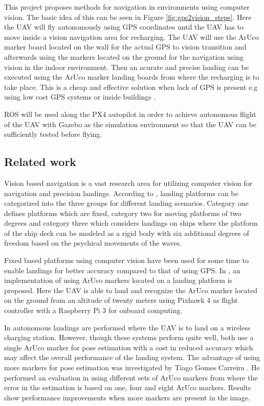\documentclass[../Head/report.tex]{subfiles}
\begin{document}
This project proposes methods for navigation in environments using computer vision. The basic idea of this can be seen in Figure \ref{fig:gps2vision_steps}. Here the UAV will fly autonomously using GPS coordinates until the UAV has to move inside a vision navigation area for recharging. The UAV will use the ArUco marker board located on the wall for the actual GPS to vision transition and afterwards using the markers located on the ground for the navigation using vision in the indoor environment. Then an acurate and precise landing can be executed using the ArUco marker landing boards from where the recharging is to take place. This is a cheap and effective solution when lack of GPS is present e.g using low cost GPS systems or inside buildings \cite{Visual-Inertial-Navigation}. 

ROS will be used along the PX4 autopilot in order to achieve autonomous flight of the UAV with Gazebo as the simulation environment so that the UAV can be sufficiently tested before flying. 

\subsection{Related work}
\label{sec:related_work}

Vision based navigation is a vast research area for utilizing computer vision for navigation and precision landings. According to \cite{OnBoardVisionAutonomousLanding}, landing platforms can be categorized into the three groups for different landing scenarios. Category one defines platforms which are fixed, category two for moving platforms of two degrees and category three which considers landings on ships where the platform of the ship deck can be modeled as a rigid body with six additional degrees of freedom based on the psychical movements of the waves. 

Fixed based platforms using computer vision have been used for some time to enable landings for better accuracy compared to that of using GPS. In \cite{AVisionBasedSystemForAutonomousVerticaLanding}, an implementation of using ArUco markers located on a landing platform is proposed. Here the UAV is able to land and recognize the ArUco marker located on the ground from an altitude of twenty meters using Pixhawk 4 as flight controller with a Raspberry Pi 3 for onboard computing. 

In \cite{AutonomousRechargingSystemforDronesOne} \cite{AutonomousRechargingSystemforDronesTwo} autonomous landings are performed where the UAV is to land on a wireless charging station. However, though these systems perform quite well, both use a single ArUco marker for pose estimation with a cost in reduced accuracy which may affect the overall performance of the landing system. The advantage of using more markers for pose estimation was investigated by Tiago Gomes Carreira \cite{QuadcopterAutomaticLandingOnaDockingStation}. He performed an evaluation in using different sets of ArUco markers from where the error in the estimation is based on one, four and eight ArUco markers. Results show performance improvements when more markers are present in the image. 
\end{document}
